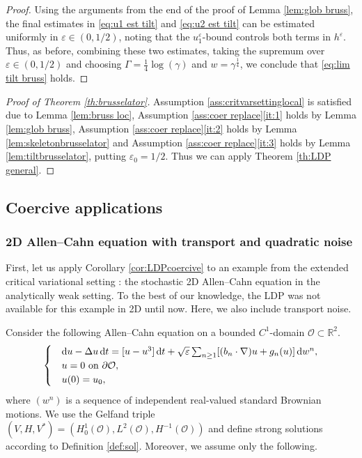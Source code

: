 \documentclass{amsart}
\newcommand{\dd}{\,\mathrm{d}}
\newcommand{\ddd}{\mathrm{d}}
\newcommand{\<}{\langle}
\newcommand{\?}{\rangle}
\renewcommand{\O}{\mathcal{O}}
\theoremstyle{plain}
\theoremstyle{remark}
\theoremstyle{plain}
\numberwithin{equation}{section}
\def\R{{\mathbb R}}
\newcommand{\eps}{\varepsilon}
\begin{document}
\begin{proof}
Using the arguments from the end of the proof of Lemma \ref{lem:glob bruss}, the final estimates in \eqref{eq:u1 est tilt} and \eqref{eq:u2 est tilt} can be estimated uniformly in  $\eps\in(0,1/2)$, noting that the $u_1^\eps$-bound controls both terms in $h^\eps$. Thus, as before, combining these two estimates, taking the supremum over $\eps\in(0,1/2)$  and choosing $\Gamma=\tfrac14\log(\gamma)$ and $w=\gamma^{\frac14}$, we conclude that \eqref{eq:lim tilt bruss} holds.
 \end{proof}
 
\begin{proof}[Proof of Theorem \ref{th:brusselator}]
Assumption \ref{ass:critvarsettinglocal} is satisfied due to Lemma \ref{lem:bruss loc},  Assumption \ref{ass:coer replace}\ref{it:1} holds by Lemma \ref{lem:glob bruss}, Assumption \ref{ass:coer replace}\ref{it:2} holds by Lemma  \ref{lem:skeletonbrusselator} and Assumption \ref{ass:coer replace}\ref{it:3} holds by Lemma \ref{lem:tiltbrusselator}, putting $\eps_0=1/2$. Thus we can apply Theorem \ref{th:LDP general}. 
\end{proof}
 
 
\subsection{Coercive applications}\label{ss:appl coer}

\subsubsection{\textbf{2D Allen--Cahn equation with transport and quadratic noise}}\label{ss:allen}
First, let us apply Corollary \ref{cor:LDPcoercive} to an example from the extended critical variational setting \cite[Ex.\ 8.4]{BGV}: the stochastic 2D Allen--Cahn equation in the analytically weak setting. 
To the best of our knowledge, the LDP was not available for this example in 2D until now. Here, we  also include transport noise. 

Consider the following Allen--Cahn equation on a bounded $C^1$-domain $\O\subset \R^2$. 
\begin{equation}\label{eq:allen}
     \begin{cases}
   &\ddd {u}-\Delta {u}\dd t=[ {u}-{u}^3]\dd t+\sqrt{\eps}\sum_{n\geq 1}[(b_n\cdot\nabla){u}+g_n({u})]\dd w^n,   \\ 
   &{u}=0 \textup{ on }\partial\O,\\
   &{u}(0)=u_0,
\end{cases}
\end{equation}
where $(w^n)$ is a sequence of independent real-valued standard Brownian motions. 
We use the Gelfand triple $(V,H,V^*)=(H^1_0(\O),L^2(\O),H^{-1}(\O))$ and define strong solutions according to Definition \ref{def:sol}. Moreover, we assume only the following.
\end{document}
